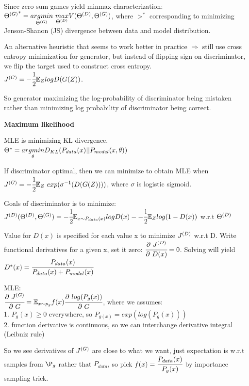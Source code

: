 \documentclass[12pt,a4paper]{article}
\begin{document}
Since zero sum games yield minmax characterization: \\
${\gt}^* =\argminp{\gt}\ \underset{\dt}{max}V(\dt,\gt)$, where ${\gt}^*$ corresponding to minimizing Jenson-Shanon (JS) divergence between data and model distribution.

An alternative heuristic that seems to work better in practice $\Rightarrow$ still use cross entropy minimization for generator, but instead of flipping sign on discriminator, we flip the target used to construct cross entropy. \\
$J^{(G)}=-\cfrac{1}{2} \mathbb{E}_Z logD(G(Z))$. 

So generator maximizing the log-probability of discriminator being mistaken rather than minimizing log probability of discriminator  being correct.

\vspace{0.5cm}
\textbf{Maximum likelihood}

MLE is minimizing KL divergence. \\
$\Theta^*=\underset{\theta}{argmin}D_{KL}(P_{data}(x)||P_{model}(x,\theta))$

If discriminator optimal, then we can minimize to obtain MLE when\\ 
$\jg=\mhalf\ee_Z\ exp(\sigma^{-1}(D(G(Z))))$, where $\sigma$ is logistic sigmoid. 


\vspace{0.5cm}
Goals of discriminator is to minimize: \\
$J^{(D)}({\Theta^{(D)}},{\Theta^{(G)}})=-\cfrac{1}{2} \mathbb{E}_{x\sim P_{data}(x)}logD(x)--\cfrac{1}{2} \mathbb{E}_Z log(1-D(x))$ w.r.t ${\Theta^{(D)}}$

Value for $D(x)$ is specified for each value x to minimize $J^{(D)}$ w.r.t D.
Write functional derivatives for a given x, set it zero: 
$\cfrac{\partial\ J^{(D)}}{\partial\ D(x)}=0$. Solving will yield $D^*(x)=\cfrac{P_{data}(x)}{P_{data}(x)+P_{model}(x)}$


\vspace{0.5cm}
MLE:\\
$\cfrac{\partial\ J^{(G)}}{\partial\ G}=\mathbb{E}_{x\sim p_g}f(x)\cfrac{\partial\ log(P_g(x))}{\partial\ G}$, where we assumes:\\
1. $P_g(x)\geq 0$ everywhere, so $P_{g(x)}=exp(log(P_g(x)))$\\
2. function derivative is continuous, so we can interchange derivative integral (Leibniz rule)

So we see derivatives of $J^{(G)}$ are close to what we want, just expectation is w.r.t samples from $\P_g$ rather that $P_{data}$, so pick $f(x)=\cfrac{P_{data}(x)}{P_g(x)}$ by importance sampling trick. 
\end{document}
